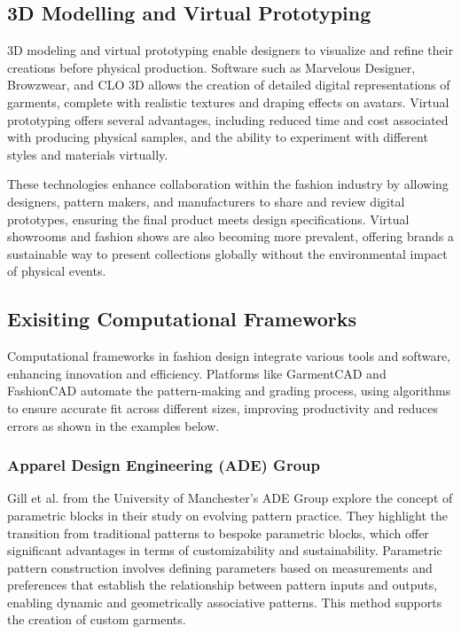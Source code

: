\subsection{3D Modelling and Virtual Prototyping}
3D modeling and virtual prototyping enable designers to visualize and refine their creations before physical production. Software such as Marvelous Designer, Browzwear, and CLO 3D allows the creation of detailed digital representations of garments, complete with realistic textures and draping effects on avatars. Virtual prototyping offers several advantages, including reduced time and cost associated with producing physical samples, and the ability to experiment with different styles and materials virtually.

These technologies enhance collaboration within the fashion industry by allowing designers, pattern makers, and manufacturers to share and review digital prototypes, ensuring the final product meets design specifications. Virtual showrooms and fashion shows are also becoming more prevalent, offering brands a sustainable way to present collections globally without the environmental impact of physical events.

\subsection{Exisiting Computational Frameworks}
Computational frameworks in fashion design integrate various tools and software, enhancing innovation and efficiency. Platforms like GarmentCAD and FashionCAD automate the pattern-making and grading process, using algorithms to ensure accurate fit across different sizes, improving productivity and reduces errors as shown in the examples below.

\subsubsection{Apparel Design Engineering (ADE) Group}
Gill et al. from the University of Manchester's ADE Group explore the concept of parametric blocks in their study on evolving pattern practice. They highlight the transition from traditional patterns to bespoke parametric blocks, which offer significant advantages in terms of customizability and sustainability. Parametric pattern construction involves defining parameters based on measurements and preferences that establish the relationship between pattern inputs and outputs, enabling dynamic and geometrically associative patterns. This method supports the creation of custom garments.

